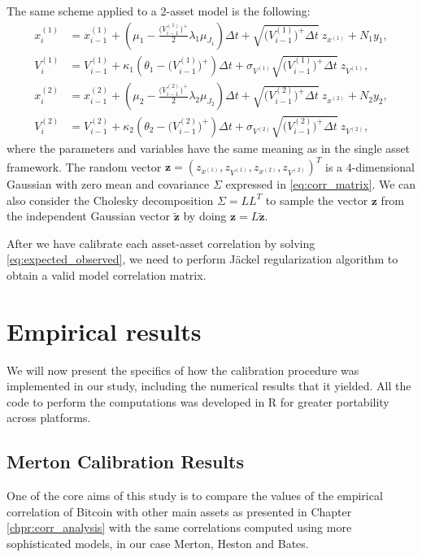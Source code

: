 The same scheme applied to a  2-asset model is the following:
\begin{subequations}
	\label{eq:bates_full_truncation2}
	\begin{align}
	x_i^{(1)} &= x_{i-1}^{(1)} + (\mu_1 -  \frac{\Big(V_{i-1}^{(1)}\Big)^+}{2} \lambda_1\mu_{J_1})\Delta t + \sqrt{\Big(V_{i-1}^{(1)}\Big)^+ \Delta t} \:z_{x^{(1)}} + N_1 y_1, \\
	V_i^{(1)} &= V_{i-1}^{(1)} + \kappa_1(\theta_1 - \Big(V_{i-1}^{(1)}\Big)^+ )\Delta t + \sigma_{V^{(1)}} \sqrt{\Big(V_{i-1}^{(1)}\Big)^+ \Delta t} \: z_{V^(1)},\\
	x_i^{(2)} &= x_{i-1}^{(2)} + (\mu_2 -  \frac{\Big(V_{i-1}^{(2)}\Big)^+}{2} \lambda_2 \mu_{J_2})\Delta t + \sqrt{\Big(V_{i-1}^{(2)}\Big)^+\Delta t} \:z_{x^{(2)}} + N_2 y_2, \\
	V_i^{(2)} &= V_{i-1}^{(2)} + \kappa_2(\theta_2 - \Big(V_{i-1}^{(2)}\Big)^+ )\Delta t + \sigma_{V^{(2)}} \sqrt{\Big(V_{i-1}^{(2)}\Big)^+ \Delta t} \: z_{V^{(2)}},
	\end{align}
\end{subequations}
where the parameters and variables have the same meaning as in the single asset framework.
The random vector $\mathbf{z} = (z_{x^{(1)}}, z_{V^{(1)}}, z_{x^{(2)}}, z_{V^{(2)}})^T$ is a 4-dimensional Gaussian with zero mean and covariance $\Sigma$ expressed in \eqref{eq:corr_matrix}. We can also consider the Cholesky decomposition $\Sigma= L L^T$ to sample the vector $\mathbf{z}$ from the independent Gaussian vector $\mathbf{\tilde{z}}$ by doing $\mathbf{z} = L \mathbf{\tilde{z}}$.

After we have calibrate each asset-asset correlation by solving \eqref{eq:expected_observed}, we need to perform J\"ackel regularization algorithm to obtain a valid model correlation matrix.

\bigskip
\section{Empirical results}
\label{sec:results_cal}
We will now present the specifics of how the calibration procedure was implemented in our study, including the numerical results that it yielded.
All the code to perform the computations was developed in R for greater portability across platforms.

\subsection{Merton Calibration Results}
One of the core aims of this study is to compare the values of the empirical correlation of Bitcoin with other main assets as presented in Chapter \ref{chpr:corr_analysis} with the same correlations computed using more sophisticated models, in our case Merton, Heston and Bates.

